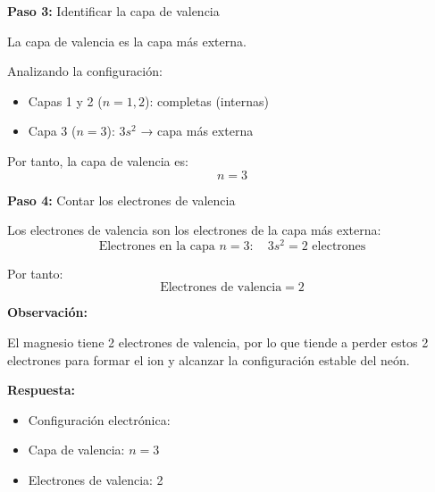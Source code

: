 \begin{exercise}
\begin{solu}
        \textbf{Paso 3:} Identificar la capa de valencia

        La capa de valencia es la capa más externa.

        Analizando la configuración:
        \begin{itemize}
            \item Capas 1 y 2 (\(n = 1, 2\)): completas (internas)
            \item Capa 3 (\(n = 3\)): \(3s^2\) → capa más externa
        \end{itemize}

        Por tanto, la capa de valencia es:
        \[
            \boxed{n = 3}
        \]

        \textbf{Paso 4:} Contar los electrones de valencia

        Los electrones de valencia son los electrones de la capa más externa:
        \[
            \text{Electrones en la capa } n = 3: \quad 3s^2 = 2 \text{ electrones}
        \]

        Por tanto:
        \[
            \boxed{\text{Electrones de valencia} = 2}
        \]

        \textbf{Observación:}

        El magnesio tiene 2 electrones de valencia, por lo que tiende a perder estos 2 electrones para formar el ion  y alcanzar la configuración estable del neón.

        \textbf{Respuesta:}
        \begin{itemize}
            \item Configuración electrónica: 
            \item Capa de valencia: \(n = 3\)
            \item Electrones de valencia: 2
        \end{itemize}
    \end{solu}
\end{exercise}
